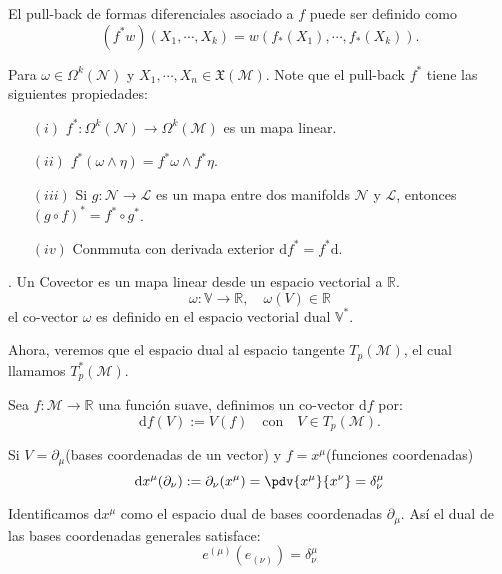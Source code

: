\documentclass[../main]{subfiles}
\begin{document}
\begin{adjustwidth}{0pt}{-100pt}
El pull-back de formas diferenciales asociado a $f$ puede ser definido como 
\begin{equation}
    (f^* w)(X_1, \cdots, X_k)=w\left(f_*(X_1), \cdots, f_*(X_k)\right).
\end{equation}

Para $\omega \in \Omega^k(\mathcal{N})$ y $X_1, \cdots, X_n \in \mathfrak{X}(\mathcal{M})$. Note que el pull-back $f^*$ tiene las siguientes propiedades:
\begin{enumerate}
    \item[$(i)$] $f^*: \Omega^k(\mathcal{N}) \rightarrow \Omega^k(\mathcal{M})$ es un mapa linear.
    \item[$(ii)$] $f^*(\omega \wedge \eta)=f^* \omega \wedge f^* \eta$.
    \item[$(iii)$] Si $g: \mathcal{N}\rightarrow \mathcal{L}$ es un mapa entre dos manifolds $\mathcal{N}$ y $\mathcal{L}$, entonces $(g \circ f)^*=f^* \circ g^*$.
    \item[$(iv)$] Conmmuta con derivada exterior $\mathrm{d}f^*=f^* \mathrm{d}$. 
\end{enumerate}

. Un Covector es un mapa linear desde un espacio vectorial a $\mathbb{R}$.
\begin{equation}
    \omega: \mathbb{V} \rightarrow \mathbb{R}, \quad \omega(V)\in \mathbb{R}
\end{equation}
el co-vector $\omega$ es definido en el espacio vectorial dual $\mathbb{V}^*$.

Ahora, veremos que el espacio dual al espacio tangente $T_p(\mathcal{M})$, el cual llamamos $T^*_p(\mathcal{M})$.

Sea $f:\mathcal{M}\rightarrow \mathbb{R}$ una función suave, definimos un co-vector $\mathrm{d}f$ por:
\begin{equation}
    \mathrm{d}f(V):=V(f) \quad \text{con} \quad V\in T_p(\mathcal{M}).
\end{equation}

Si $V=\partial_{\mu}$(bases coordenadas de un vector) y $f=x^{\mu}$(funciones coordenadas)
\begin{equation}
    \mathrm{d}x^{\mu}(\partial_{\nu}):=\partial_{\nu}(x^{\mu})=\pdv{x^{\mu}}{x^{\nu}}=\delta^{\mu}_{\nu}
\end{equation}

Identificamos $\mathrm{d}x^{\mu}$ como el espacio dual de bases coordenadas $\partial_{\mu}$. Así el dual de las bases coordenadas generales satisface:
\begin{equation}
    e^{(\mu)}(e_{(\nu)})=\delta^{\mu}_{\nu}
\end{equation}


\end{adjustwidth}
\end{document}
